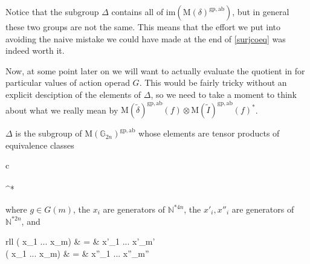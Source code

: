 Notice that the subgroup $\Delta$ contains all of $\mathrm{im}(\mathrm{M}(\delta)^{\mathrm{gp, ab}})$, but in general these two groups are not the same. This means that the effort we put into avoiding the naive mistake we could have made at the end of \cref{surjcoeq} was indeed worth it. 

Now, at some point later on we will want to actually evaluate the quotient in \label{Zmor2} for particular values of action operad $G$. This would be fairly tricky without an explicit desciption of the elements of $\Delta$, so we need to take a moment to think about what we really mean by $\mathrm{M}(\tilde{\delta})^{\mathrm{gp, ab}}(f) \otimes \mathrm{M}(\tilde{I})^{\mathrm{gp, ab}}(f)^*$.

\begin{lem} $\Delta$ is the subgroup of $\mathrm{M}(\mathbb{G}_{2n})^{\mathrm{gp, ab}}$ whose elements are tensor products of equivalence classes
\begin{eq*} \begin{array}{c}
			 \\
			\, \otimes \, \\
			^*
		\end{array}
\end{eq*} 
where $g \in G(m)$, the $x_i$ are generators of $\mathbb{N}^{\ast 4n}$, the $x'_i, x''_i$ are generators of $\mathbb{N}^{\ast 2n}$, and
\begin{eq*} \begin{array}{rll}
			\tilde{\delta}( x_1 \otimes ... \otimes x_m) & = & x'_1 \otimes ... \otimes x'_{m'} \\
			( x_1 \otimes ... \otimes x_m) & = & x''_1 \otimes ... \otimes x''_{m''}
		\end{array}
\end{eq*}
\end{lem}
